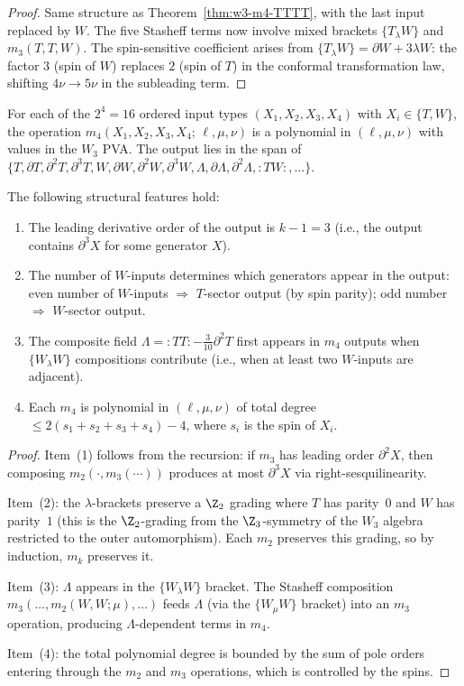\begin{proof}
Same structure as Theorem~\ref{thm:w3-m4-TTTT}, with the last input
replaced by $W$. The five Stasheff terms now involve mixed brackets
$\{T_\lambda W\}$ and $m_3(T,T,W)$.
The spin-sensitive coefficient arises from $\{T_\lambda W\} = \partial W + 3\lambda W$:
the factor $3$ (spin of $W$) replaces $2$ (spin of $T$) in the
conformal transformation law, shifting $4\nu \to 5\nu$ in the subleading term.
\end{proof}

\begin{proposition}
\label{prop:w3-m4-all-types}
For each of the $2^4 = 16$ ordered input types $(X_1, X_2, X_3, X_4)$
with $X_i \in \{T,W\}$, the operation $m_4(X_1, X_2, X_3, X_4;\, \ell, \mu, \nu)$
is a polynomial in $(\ell,\mu,\nu)$ with values in the $W_3$ PVA\@.
The output lies in the span of $\{T, \partial T, \partial^2 T, \partial^3 T, W,
\partial W, \partial^2 W, \partial^3 W, \Lambda, \partial\Lambda, \partial^2\Lambda, {:}TW{:}, \ldots\}$.

The following structural features hold:
\begin{enumerate}
\item The leading derivative order of the output is $k-1 = 3$
 (i.e., the output contains $\partial^3 X$ for some generator $X$).
\item The number of $W$-inputs determines which generators appear
 in the output: even number of $W$-inputs $\Rightarrow$ $T$-sector
 output (by spin parity); odd number $\Rightarrow$ $W$-sector output.
\item The composite field $\Lambda = {:}TT{:} - \tfrac{3}{10}\partial^2 T$
 first appears in $m_4$ outputs when $\{W_\lambda W\}$ compositions
 contribute (i.e., when at least two $W$-inputs are adjacent).
\item Each $m_4$ is polynomial in $(\ell,\mu,\nu)$ of total degree
 $\le 2(s_1 + s_2 + s_3 + s_4) - 4$, where $s_i$ is the spin of $X_i$.
\end{enumerate}
\end{proposition}

\begin{proof}
Item~(1) follows from the recursion: if $m_3$ has leading order
$\partial^2 X$, then composing $m_2(\cdot, m_3(\cdots))$ produces at most
$\partial^3 X$ via right-sesquilinearity.

Item~(2): the $\lambda$-brackets preserve a $\Z_2$ grading where $T$ has
parity~$0$ and $W$ has parity~$1$ (this is the $\Z_2$-grading from the
$\Z_3$-symmetry of the $W_3$ algebra restricted to the outer automorphism).
Each $m_2$ preserves this grading, so by induction, $m_k$ preserves it.

Item~(3): $\Lambda$ appears in the $\{W_\lambda W\}$ bracket. The
Stasheff composition $m_3(\ldots, m_2(W,W;\mu), \ldots)$ feeds $\Lambda$
(via the $\{W_\mu W\}$ bracket) into an $m_3$ operation, producing
$\Lambda$-dependent terms in $m_4$.

Item~(4): the total polynomial degree is bounded by the sum of pole
orders entering through the $m_2$ and $m_3$ operations, which is
controlled by the spins.
\end{proof}

